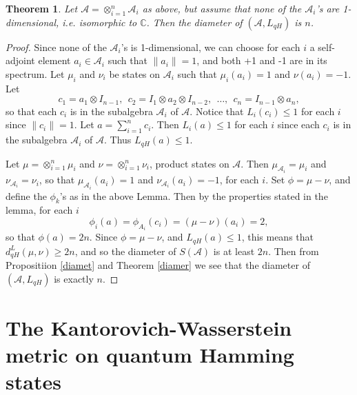 \documentclass{amsart}[14pt]
\newtheorem{theorem}{Theorem}[section]
\theoremstyle{definition}
\theoremstyle{remark}
\newcommand{\cA}{{\mathcal A}}
\newcommand{\bC}{{\mathbb C}}
\newcommand{\<}{\langle}
\renewcommand{\>}{\rangle}
\numberwithin{equation}{section}
\begin{document}
{\begin{theorem}
\label{diam}
Let $\cA = \otimes_{i=1}^n \cA_i $ as above, but assume that none
of the $\cA_i$'s are 1-dimensional, i.e. isomorphic to $\bC$. Then
the diameter of $(\cA, L_{qH})$ is $n$.  
\end{theorem}

\begin{proof}
Since none of the $\cA_i$'s is 1-dimensional, we can choose for
each $i$ a self-adjoint element $a_i \in \cA_i$ such that $\|a_i\| = 1$,
and both +1 and -1 are in its spectrum. Let $\mu_i$ and $\nu_i$
be states on $\cA_i$ such that $\mu_i(a_i) = 1$ and $\nu(a_i)= -1$.
Let
\[
c_1 = a_1 \otimes I_{n-1} , \ \ c_2 =   I_1 \otimes a_2 \otimes I_{n-2}, \ \ \dots , \ \
c_n =I_{n-1} \otimes a_n     ,
\]
so that each $c_i$ is in the subalgebra $\cA_i$ of $\cA$.
Notice that $L_i(c_i) \leq 1$ for each $i$ since $\|c_i\| = 1$. 
Let $a = \sum_{i=1}^n c_i$. Then $L_i(a) \leq 1$ for each $i$ since
each $c_i$ is in the subalgebra $\cA_i$ of $\cA$. 
Thus $L_{qH}(a) \leq 1$.

Let $\mu = \otimes_{i= 1}^n  \mu_i$ and $\nu = \otimes_{i= 1}^n  \nu_i$,
product states on $\cA$. Then $\mu_{\cA_i} = \mu_i$ and  
$\nu_{\cA_i} = \nu_i$, so that  $\mu_{\cA_i}(a_i) = 1$ and 
$\nu_{\cA_i}(a_i) = -1$, for each $i$. 
Set $\phi = \mu - \nu$, and define
the $\phi_k$'s as in the above Lemma. Then by the properties stated
in the lemma, for each $i$
\[
\phi_i(a) = \phi_{A_i}(c_i) = (\mu - \nu)(a_i) = 2   ,
\]
so that $\phi(a) = 2n$. Since $\phi = \mu - \nu$, and $L_{qH}(a) \leq 1$,
this means that $d^L_{qH}(\mu, \nu) \geq 2n$, and so the diameter
of $S(\cA)$ is at least $2n$. Then from Propositiion \ref{diamet} 
and Theorem \ref{diamer} we see
that the diameter of  $(\cA, L_{qH})$ is exactly $n$.
\end{proof}


\section{The Kantorovich-Wasserstein metric on quantum Hamming states}
\label{states}

}
\end{document}
